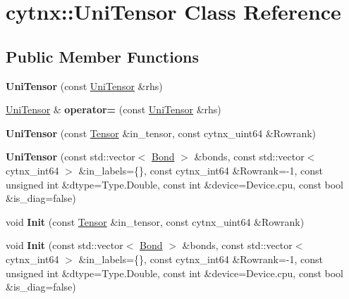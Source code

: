 \hypertarget{classcytnx_1_1UniTensor}{}\section{cytnx\+:\+:Uni\+Tensor Class Reference}
\label{classcytnx_1_1UniTensor}
\subsection*{Public Member Functions}
\begin{DoxyCompactItemize}
\item 
\mbox{\label{classcytnx_1_1UniTensor_a456aaaa3a3872c0bae08a51336703a51}} 
{\bfseries Uni\+Tensor} (const \hyperlink{classcytnx_1_1UniTensor}{Uni\+Tensor} \&rhs)
\item 
\mbox{\label{classcytnx_1_1UniTensor_acf9b9716f211126c98b3cb63140b72ef}} 
\hyperlink{classcytnx_1_1UniTensor}{Uni\+Tensor} \& {\bfseries operator=} (const \hyperlink{classcytnx_1_1UniTensor}{Uni\+Tensor} \&rhs)
\item 
\mbox{\label{classcytnx_1_1UniTensor_a7a5b9286ae4bc1ef5afa00105f222a13}} 
{\bfseries Uni\+Tensor} (const \hyperlink{classcytnx_1_1Tensor}{Tensor} \&in\+\_\+tensor, const cytnx\+\_\+uint64 \&Rowrank)
\item 
\mbox{\label{classcytnx_1_1UniTensor_acc305e7b7767843bd282a9c2cc49114c}} 
{\bfseries Uni\+Tensor} (const std\+::vector$<$ \hyperlink{classcytnx_1_1Bond}{Bond} $>$ \&bonds, const std\+::vector$<$ cytnx\+\_\+int64 $>$ \&in\+\_\+labels=\{\}, const cytnx\+\_\+int64 \&Rowrank=-\/1, const unsigned int \&dtype=Type.\+Double, const int \&device=Device.\+cpu, const bool \&is\+\_\+diag=false)
\item 
\mbox{\label{classcytnx_1_1UniTensor_ae94c74dc715d1ed3aa409a894d4dddfb}} 
void {\bfseries Init} (const \hyperlink{classcytnx_1_1Tensor}{Tensor} \&in\+\_\+tensor, const cytnx\+\_\+uint64 \&Rowrank)
\item 
\mbox{\label{classcytnx_1_1UniTensor_ad6ba5c7452b4d83bfbaa9770060f8a63}} 
void {\bfseries Init} (const std\+::vector$<$ \hyperlink{classcytnx_1_1Bond}{Bond} $>$ \&bonds, const std\+::vector$<$ cytnx\+\_\+int64 $>$ \&in\+\_\+labels=\{\}, const cytnx\+\_\+int64 \&Rowrank=-\/1, const unsigned int \&dtype=Type.\+Double, const int \&device=Device.\+cpu, const bool \&is\+\_\+diag=false)

\end{DoxyCompactItemize}
